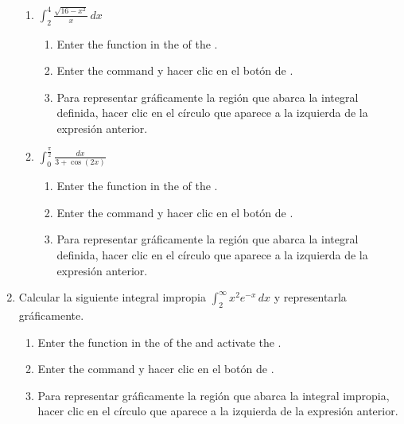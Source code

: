 \begin{enumerate}[leftmargin=*]
\begin{enumerate}
      \item $\displaystyle \int_2^4 \frac{\sqrt{16-x^{2}}}{x}\,dx$
            \begin{indication}
            \begin{enumerate}
            \item Enter the function  in the  of the .
            \item Enter the command  y hacer clic en el botón de .
            \item Para representar gráficamente la región que abarca la integral definida, hacer clic en el círculo que aparece a la izquierda de la expresión anterior.
            \end{enumerate}
            \end{indication}

      \item $\displaystyle \int_0^{\frac{\pi}{2}} \frac{dx}{3+\cos(2x)}$
            \begin{indication}
            \begin{enumerate}
            \item Enter the function  in the  of the .
            \item Enter the command  y hacer clic en el botón de .
            \item Para representar gráficamente la región que abarca la integral definida, hacer clic en el círculo que aparece a la izquierda de la expresión anterior.
            \end{enumerate}
            \end{indication}
      \end{enumerate}

\item Calcular la siguiente integral impropia $\int_2^{\infty} x^2e^{-x}\,dx$ y representarla gráficamente.
      \begin{indication}
      \begin{enumerate}
      \item Enter the function  in the  of the  and activate the .
      \item Enter the command  y hacer clic en el botón de .
      \item Para representar gráficamente la región que abarca la integral impropia, hacer clic en el círculo que aparece a la izquierda de la expresión anterior.
      \end{enumerate}
      \end{indication}



\end{enumerate}
